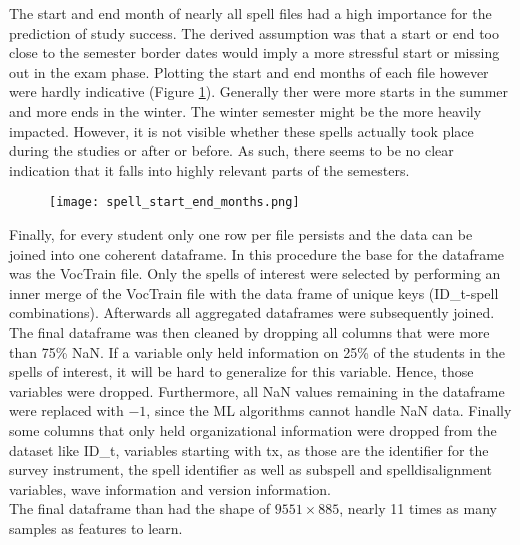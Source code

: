 The start and end month of nearly all spell files had a high importance for the prediction of study success. The derived assumption was that a start or end too close to the semester border dates would imply a more stressful start or missing out in the exam phase. Plotting the start and end months of each file however were hardly indicative (Figure \ref{fig:spell_start_end_months}). Generally ther were more starts in the summer and more ends in the winter. The winter semester might be the more heavily impacted. However, it is not visible whether these spells actually took place during the studies or after or before. As such, there seems to be no clear indication that it falls into highly relevant parts of the semesters.
\begin{figure}
    \centering
    \texttt{[image: spell\_start\_end\_months.png]}
    \label{fig:spell_start_end_months}
\end{figure}

Finally, for every student only one row per file persists and the data can be joined into one coherent dataframe. In this procedure the base for the dataframe was the VocTrain file. Only the spells of interest were selected by performing an inner merge of the VocTrain file with the data frame of unique keys (ID\_t-spell combinations). Afterwards all aggregated dataframes were subsequently joined. The final dataframe was then cleaned by dropping all columns that were more than 75\% NaN. If a variable only held information on 25\% of the students in the spells of interest, it will be hard to generalize for this variable. Hence, those variables were dropped. Furthermore, all NaN values remaining in the dataframe were replaced with $-1$, since the ML algorithms cannot handle NaN data. Finally some columns that only held organizational information were dropped from the dataset like ID\_t, variables starting with tx, as those are the identifier for the survey instrument, the spell identifier as well as subspell and spelldisalignment variables, wave information and version information.\\
The final dataframe than had the shape of $9551 \times 885$, nearly 11 times as many samples as features to learn.

